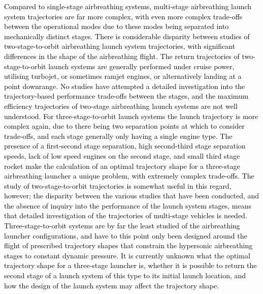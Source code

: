   	   \textcolor{black}{
  	  Compared to single-stage airbreathing systems, multi-stage airbreathing launch system trajectories are far more complex, with even more complex trade-offs between the operational modes due to these modes being separated into mechanically distinct stages\cite{Bulirsch1995}.   	  
  	  There is considerable disparity between studies of two-stage-to-orbit airbreathing launch system trajectories, with significant differences in the shape of the airbreathing flight\cite{Wilhite1991,Fujikawa2017,Mehta2001,Takahashi1997,Aberleen,Germain2001,Eklund2012,Bradford2002,Kimura1999,Preller2018a}.
  	  The return trajectories of two-stage-to-orbit launch systems are generally performed under cruise power, utilising turbojet, or sometimes ramjet engines\cite{Wilhite1991,Mehta2001,Eklund2012,Bradford2002}, or alternatively landing at a point downrange\cite{Takahashi1997}.  No studies have attempted a detailed investigation into the trajectory-based performance trade-offs between the stages, and the maximum efficiency trajectories of two-stage airbreathing launch systems are not well understood. 
  	   For three-stage-to-orbit launch systems the launch trajectory is more complex again, due to there being two separation points at which to consider trade-offs, and each stage generally only having a single engine type. 
  	   The presence of a first-second stage separation, high second-third stage separation speeds, lack of low speed engines on the second stage, and small third stage rocket make the calculation of an optimal trajectory shape for a three-stage airbreathing launcher a unique problem, with extremely complex trade-offs. The study of two-stage-to-orbit trajectories is somewhat useful in this regard, however; the disparity between the various studies that have been conducted, and the absence of inquiry into the performance of the launch system stages, means that detailed investigation of the trajectories of multi-stage vehicles is needed. 
  	   Three-stage-to-orbit systems are by far the least studied of the airbreathing launcher configurations, and have to this point only been designed around the flight of prescribed trajectory shapes that constrain the hypersonic airbreathing stages to constant dynamic pressure\cite{Kimura1999,Preller2018a}. It is currently unknown what the optimal trajectory shape for a three-stage launcher is, whether it is possible to return the second stage of a launch system of this type to its initial launch location, and how the design of the launch system may affect the trajectory shape. 
  	}
  	   
